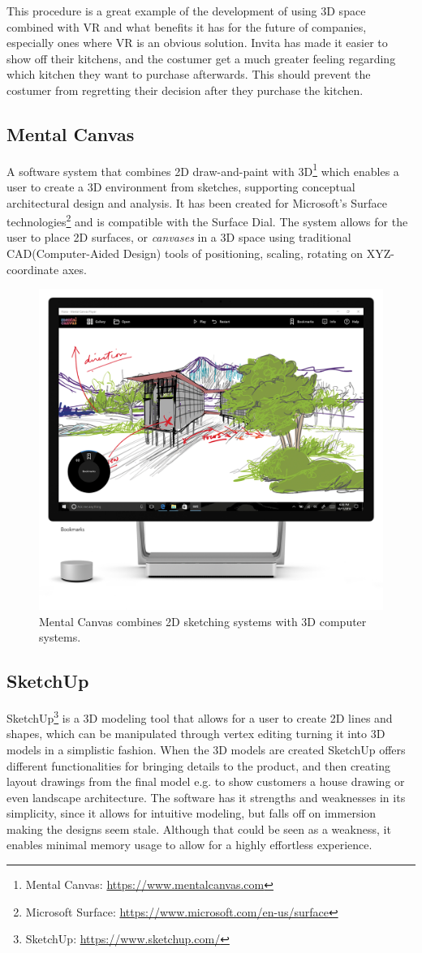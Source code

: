 			This procedure is a great example of the development of using 3D space combined with VR and what benefits it has for the future of companies, especially ones where VR is an obvious solution. Invita has made it easier to show off their kitchens, and the costumer get a much greater feeling regarding which kitchen they want to purchase afterwards. This should prevent the costumer from regretting their decision after they purchase the kitchen.

			
		\subsection{Mental Canvas}\label{sec:mental}
			A software system that combines 2D draw-and-paint with 3D\footnote{Mental Canvas: \url{https://www.mentalcanvas.com}} which enables a user to create a 3D environment from sketches, supporting conceptual architectural design and analysis. It has been created for Microsoft's Surface technologies\footnote{Microsoft Surface: \url{https://www.microsoft.com/en-us/surface}} and is compatible with the Surface Dial. The system allows for the user to place 2D surfaces, or \textit{canvases} in a 3D space using traditional CAD(Computer-Aided Design) tools of positioning, scaling, rotating on XYZ-coordinate axes.\cite{sotaMentalCanvas}
			
			\begin{figure}[H]
				\centering
				\includegraphics[width=0.5\linewidth]{figure/Analysis/mentalCanvas.png}
				\caption{Mental Canvas combines 2D sketching systems with 3D computer systems.}
				\label{fig:mentalCanvas}
			\end{figure}

		\subsection{SketchUp}
			SketchUp\footnote{SketchUp: \url{https://www.sketchup.com/}} is a 3D modeling tool that allows for a user to create 2D lines and shapes, which can be manipulated through vertex editing turning it into 3D models in a simplistic fashion. When the 3D models are created SketchUp offers different functionalities for bringing details to the product, and then creating layout drawings from the final	model e.g. to show customers a house drawing or even landscape architecture. The software has it strengths and weaknesses in its simplicity, since it allows for intuitive modeling, but falls off on immersion making the designs seem stale. Although that could be seen as a weakness, it enables minimal memory usage to allow for a highly effortless experience. \\
			
